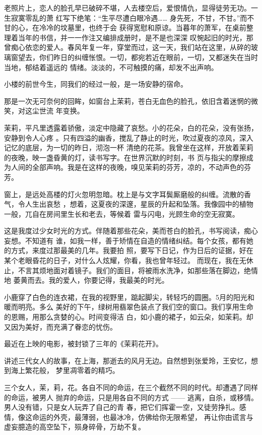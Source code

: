 \documentclass[12pt,a4paper]{article}
\begin{document}
		老照片上，恋人的脸孔早已破碎不堪，人去楼空后，爱恨情仇，显得徒劳无功。一生寂寞零乱的萧
	红写下绝笔：“生平尽遭白眼冷遇…… 身先死，不甘，不甘。”而不甘的心，在冷冷的坟墓里，也终于会
	获得宽慰和原谅。当暮年的萧军，在桌前整理着当年的书信，并一一作注又编排成册时，是不是也深深
	叹惋起旧的时光，那曾痴心依恋的爱人。春风年复一年，穿堂而过，这一天，我们站在这里，从碎的玻
	璃窗望去，你们昨日的纠缠怅恨。一切，都宛若近在眼前，一切，又都迷失在当时当地，郁结着遥远的
	情绪。淡淡的，不可触摸的痛，却发不出声响。

		小楼的前世今生，同我们的经过一般，是一场安静的宿命。

	\endwriting



		那是一次无可奈何的回眸，如窗台上茉莉，苍白无血色的脸孔，依旧含着迷惘的微笑，对这尘世流
	年变换。

		茉莉，平凡里透露着骄傲，淡定中隐藏了哀愁。小的花朵，白的花朵，没有张扬，安静到令人心疼
	。只有四溢的幽香，搅乱了静止的时光，吹过夏夜的凉风，深入记忆的底层，为一切的昨日，沏泡一杯
	清绝的花茶。我曾坐在这样，开放着茉莉的夜晚，映一盏昏黄的灯，读书写字。在世界沉默的时刻，书
	页与指尖的摩擦成为人间的全部声响。我是在这样的夜晚，嗅见茉莉的芬芳，凉的，不动声色的芬芳。

		窗上，是远处高楼的灯火忽明忽暗。枕上是与文字耳鬓厮磨般的纠缠。流散的香气，令人生出哀愁
	，想着，这夏夜的深邃，星辰的升起和坠落。我像园中的植物一般，兀自在房间里生长和老去，等候着
	雷与闪电，光顾生命的空无寂寞。

		这是我度过少女时光的方式。伴随着那些花朵，美而苍白的脸孔，书写阅读，痴心妄想。不知道有
	谁，如我一样，善于矫情在自造的情绪纠结。每个女孩，都有她的方式，来度过那最美的几年。我要拍
	照，要写下日记，作为日后的证据，好在某个老眼昏花的日子，对什么人炫耀，你看，我也曾年轻过。
	而现在，我在无休止，不言其烦地面对着镜子。我们的面目，将被雨水洗净，如那些落在脚边，绝情地
	萎黄而去。我的爱人，你要记得，我最美的时光。

		小鹿穿了白色的连衣裙，在我的视野里，踮起脚尖，转轻巧的圆圈。5月的阳光和暖而明亮。多么
	美好的下午，绿树用翡翠色装点了我们空的窗口。我们享用生命的恩赐，用那么贪婪的心。时间变得洁
	白，如小鹿的裙子，如云朵，如茉莉。却又因为美好，而充满了眷恋的忧伤。

		最近在上映的电影，被封锁了三年的《茉莉花开》。

		讲述三代女人的故事，在上海，那逝去的风月无边。自然想到张爱玲，王安忆，想到海上繁花般，
	梦里凋零着的精巧。

		三个女人，茉，莉，花。各自不同的命运，在三个截然不同的时代。却遭遇了同样的命运，被男人
	抛弃的命运，只是用各自不同的方式 —— 逃离，自杀，或移情。男人没有错，只是女人玩弄了自己的青
	春，把它们挥霍一空，又徒劳挣扎。感情，像这命运的外壳，最薄弱，也最冰冷，仿佛给你无限希望，
	再让你由谎言与虚妄臆造的高空坠下，殒身碎骨，万劫不复。
\end{document}

